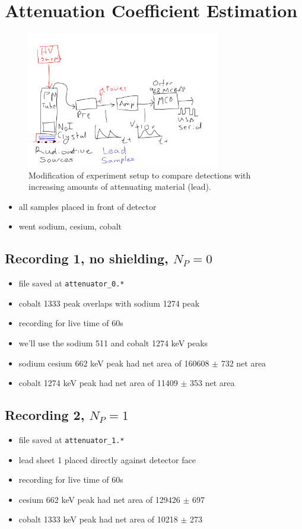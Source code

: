 \documentclass[a4paper]{article}
\begin{document}
\section{Attenuation Coefficient Estimation}

\begin{figure}[H]
    \centering
    \includegraphics[width=0.75\textwidth]{figures/attenuation-setup.pdf}
    \caption{Modification of experiment setup to compare detections with increasing amounts of attenuating material (lead).}
\end{figure}

\begin{itemize}
    \item all samples placed in front of detector
    \item went sodium, cesium, cobalt
\end{itemize}
\subsection{Recording 1, no shielding, $N_{P}=0$}
\begin{itemize}
    \item file saved at \verb|attenuator_0.*|
    \item cobalt 1333 peak overlaps with sodium 1274 peak
    \item recording for live time of 60s
    \item we'll use the sodium 511 and cobalt 1274 keV peaks
    \item sodium cesium 662 keV peak had net area of 160608 $\pm$ 732 net area
    \item cobalt 1274 keV peak had net area of 11409 $\pm$ 353 net area
\end{itemize}
\subsection{Recording 2, $N_{P}=1$}
\begin{itemize}
    \item file saved at \verb|attenuator_1.*|
    \item lead sheet 1 placed directly against detector face
    \item recording for live time of 60s
    \item cesium 662 keV peak had net area of 129426 $\pm$ 697
    \item cobalt 1333 keV peak had net area of 10218 $\pm$ 273
\end{itemize}
\end{document}
